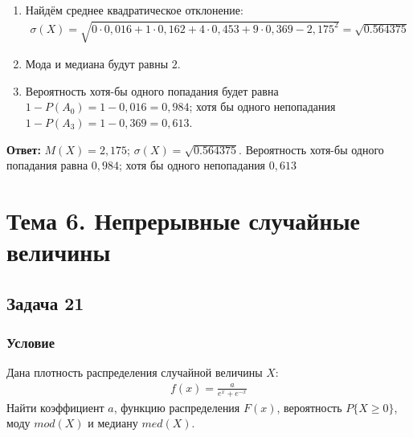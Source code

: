 \documentclass[14pt]{article}
\begin{document}
\begin{enumerate}[wide, labelwidth=!, labelindent=0pt]
        \item Найдём среднее квадратическое отклонение:
        \begin{gather*}
            \sigma(X) = \sqrt{0 \cdot 0,016 + 1 \cdot 0,162 + 4 \cdot 0,453 + 9 \cdot 0,369 - 2,175^2} = \sqrt{0.564375}
        \end{gather*}

        \item Мода и медиана будут равны $2$.
        \item Вероятность хотя-бы одного попадания будет равна $1 - P(A_0) = 1 - 0,016 = 0,984$; хотя бы одного непопадания $1 - P(A_3) = 1 - 0,369 = 0,613$.
    \end{enumerate}
    \hspace{200pt}\textbf{Ответ:} $M(X) = 2,175$; $\sigma(X)= \sqrt{0.564375}$.
    Вероятность хотя-бы одного попадания равна $0,984$; хотя бы одного непопадания $0,613$

    \newpage

    \section*{Тема 6. Непрерывные случайные величины}

    \subsection*{Задача 21}
    \subsubsection*{Условие}

    Дана плотность распределения случайной величины $X$:
    \begin{gather*}
        f(x) = \frac{a}{e^x + e^{-x}}
    \end{gather*}
    Найти коэффициент $a$, функцию распределения $F(x)$, вероятность $P\{X \geq 0 \}$, моду $mod(X)$ и медиану $med(X)$.
\end{document}
